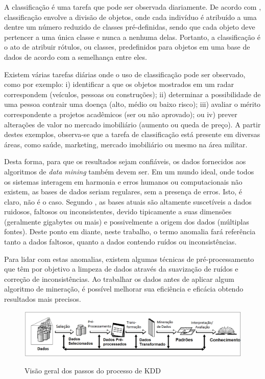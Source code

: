 A classificação é uma tarefa que pode ser observada diariamente. De acordo com , classificação envolve a divisão de objetos, onde cada indivíduo é atribuído a uma dentre um número reduzido de classes pré\hyp{}definidas, sendo que cada objeto deve pertencer a uma única classe e nunca a nenhuma delas. Portanto, a classificação é o ato de atribuir rótulos, ou classes, predefinidos para objetos em uma base de dados de acordo com a semelhança entre eles.

Existem várias tarefas diárias onde o uso de classificação pode ser observado, como por exemplo: i) identificar a que os objetos mostrados em um radar correspondem (veículos, pessoas ou construções); ii) determinar a possibilidade de uma pessoa contrair uma doença (alto, médio ou baixo risco); iii) avaliar o mérito correspondente a projetos acadêmicos (ser ou não aprovado); ou iv) prever alterações de valor no mercado imobiliário (aumento ou queda de preço). A partir destes exemplos, observa-se que a tarefa de classificação está presente em diversas áreas, como saúde, marketing, mercado imobiliário ou mesmo na área militar.
	
Desta forma, para que os resultados sejam confiáveis, os dados fornecidos aos algoritmos de \textit{data mining} também devem ser. Em um mundo ideal, onde todos os sistemas interagem em harmonia e erros humanos ou computacionais não existem, as bases de dados seriam regulares, sem a presença de erros. Isto, é claro, não é o caso. Segundo , as bases atuais são altamente suscetíveis a dados ruidosos, faltosos ou inconsistentes, devido tipicamente a suas dimensões (geralmente gigabytes ou mais) e possivelmente a origem dos dados (múltiplas fontes). Deste ponto em diante, neste trabalho, o termo anomalia fará referência tanto a dados faltosos, quanto a dados contendo ruídos ou inconsistências.

Para lidar com estas anomalias, existem algumas técnicas de pré\hyp{}processamento que têm por objetivo a limpeza de dados através da suavização de ruídos e correção de inconsistências. Ao trabalhar os dados antes de aplicar algum algoritmo de mineração, é possível melhorar sua eficiência e eficácia obtendo resultados mais precisos.

\begin{figure}[H]
    \centering
    \caption{Visão geral dos passos do processo de KDD}
    \includegraphics[width=\linewidth]{figuras/kdd-process.png}
    \label{fig:kdd-process}
\end{figure}

